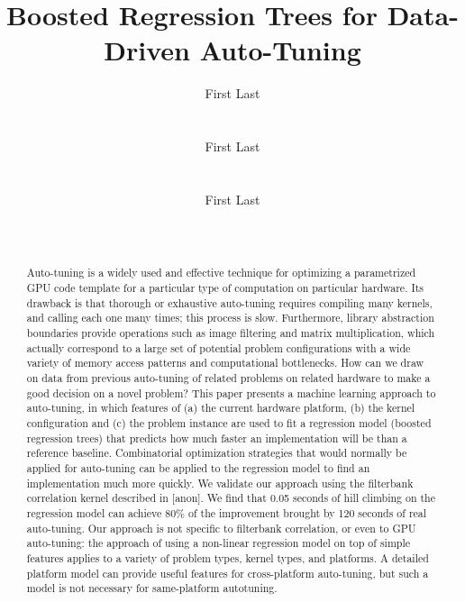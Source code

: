 \documentclass{sig-alternate}
\title{Boosted Regression Trees for Data-Driven Auto-Tuning}
\author{
\alignauthor First Last\\
\affaddr{Affiliation line 1}\\
\affaddr{Affiliation line 2}\\
\email{anon@mail.com}
\alignauthor First Last\\
\affaddr{Affiliation line 1}\\
\affaddr{Affiliation line 2}\\
\email{anon@mail.com}
\alignauthor First Last\\
\affaddr{Affiliation line 1}\\
\affaddr{Affiliation line 2}\\
\email{anon@mail.com}
}
\begin{document}
\maketitle

\begin{abstract}
Auto-tuning is a widely used and effective technique for optimizing a
parametrized GPU code template for a particular type of computation on
particular hardware.
Its drawback is that thorough or exhaustive auto-tuning requires compiling
many kernels, and calling each one many times; this process is slow.
Furthermore, library abstraction boundaries provide operations such as image
filtering and matrix multiplication, which actually correspond to a large set
of potential problem configurations with a wide variety of memory
access patterns and computational bottlenecks.
How can we draw on data from previous auto-tuning of related problems on related hardware to make a
good decision on a novel problem?
This paper presents a machine learning approach to auto-tuning, in
which features of
(a) the current hardware platform,
(b) the kernel configuration
and (c) the problem instance are used to fit a regression model (boosted regression trees) that predicts
how much faster an implementation will be than a reference baseline.
Combinatorial optimization strategies that would normally be applied for auto-tuning can be applied to the regression model to find an implementation much more quickly.
We validate our approach using the filterbank correlation kernel described in [anon].
We find that 0.05 seconds of hill climbing on the regression model can achieve
80\% of the improvement brought by 120 seconds of real auto-tuning.
Our approach is not specific to filterbank correlation, or even to GPU auto-tuning: the approach of using a non-linear regression model on top of simple features applies to a variety of problem types, kernel types, and platforms.
A detailed platform model can provide useful features for
cross-platform auto-tuning, but such a model is not necessary for same-platform autotuning.
\end{abstract}
\end{document}
